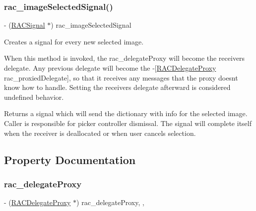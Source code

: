 \subsubsection{\texorpdfstring{rac\+\_\+image\+Selected\+Signal()}{rac\_imageSelectedSignal()}\hspace{0.1cm}{\footnotesize\ttfamily [3/3]}}
{\footnotesize\ttfamily -\/ (\mbox{\hyperlink{interface_r_a_c_signal}{R\+A\+C\+Signal}} $\ast$) rac\+\_\+image\+Selected\+Signal \begin{DoxyParamCaption}{ }\end{DoxyParamCaption}}

Creates a signal for every new selected image.

When this method is invoked, the {\ttfamily rac\+\_\+delegate\+Proxy} will become the receiver\textquotesingle{}s delegate. Any previous delegate will become the -\/\mbox{[}\mbox{\hyperlink{interface_r_a_c_delegate_proxy}{R\+A\+C\+Delegate\+Proxy}} rac\+\_\+proxied\+Delegate\mbox{]}, so that it receives any messages that the proxy doesn\textquotesingle{}t know how to handle. Setting the receiver\textquotesingle{}s {\ttfamily delegate} afterward is considered undefined behavior.

Returns a signal which will send the dictionary with info for the selected image. Caller is responsible for picker controller dismissal. The signal will complete itself when the receiver is deallocated or when user cancels selection. 

\subsection{Property Documentation}
\mbox{\label{category_u_i_image_picker_controller_07_r_a_c_signal_support_08_a37faa6b8c14f54b8751a216a048503da}} 
\subsubsection{\texorpdfstring{rac\+\_\+delegate\+Proxy}{rac\_delegateProxy}}
{\footnotesize\ttfamily -\/ (\mbox{\hyperlink{interface_r_a_c_delegate_proxy}{R\+A\+C\+Delegate\+Proxy}} $\ast$) rac\+\_\+delegate\+Proxy\hspace{0.3cm}{\ttfamily [read]}, {\ttfamily [nonatomic]}, {\ttfamily [strong]}}

